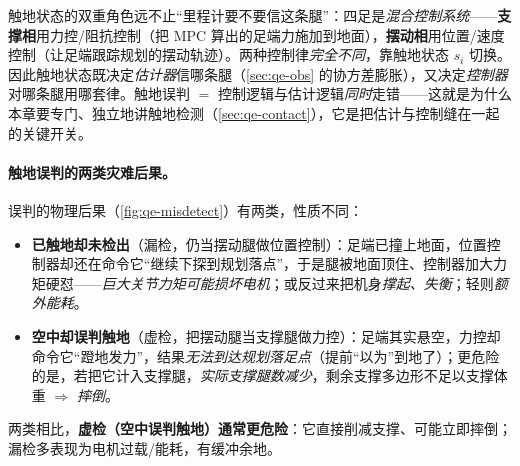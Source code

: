 \begin{insight}[触地检测是混合控制的开关]\label{ins:qe-contact-switch}
触地状态的双重角色远不止“里程计要不要信这条腿”：四足是\emph{混合控制系统}——\textbf{支撑相}用力控/阻抗控制（把 MPC 算出的足端力施加到地面），\textbf{摆动相}用位置/速度控制（让足端跟踪规划的摆动轨迹）。两种控制律\emph{完全不同}，靠触地状态 $s_i$ 切换。因此触地状态既决定\emph{估计器}信哪条腿（\cref{sec:qe-obs} 的协方差膨胀），又决定\emph{控制器}对哪条腿用哪套律。触地误判 $=$ 控制逻辑与估计逻辑\emph{同时}走错——这就是为什么本章要专门、独立地讲触地检测（\cref{sec:qe-contact}），它是把估计与控制缝在一起的关键开关。
\end{insight}

\paragraph{触地误判的两类灾难后果。}
误判的物理后果（\cref{fig:qe-misdetect}）有两类，性质不同：
\begin{itemize}
  \item \textbf{已触地却未检出}（漏检，仍当摆动腿做位置控制）：足端已撞上地面，位置控制器却还在命令它“继续下探到规划落点”，于是腿被地面顶住、控制器加大力矩硬怼——\emph{巨大关节力矩可能损坏电机}；或反过来把机身\emph{撑起、失衡}；轻则\emph{额外能耗}。
  \item \textbf{空中却误判触地}（虚检，把摆动腿当支撑腿做力控）：足端其实悬空，力控却命令它“蹬地发力”，结果\emph{无法到达规划落足点}（提前“以为”到地了）；更危险的是，若把它计入支撑腿，\emph{实际支撑腿数减少}，剩余支撑多边形不足以支撑体重 $\Rightarrow$ \emph{摔倒}。
\end{itemize}
两类相比，\textbf{虚检（空中误判触地）通常更危险}：它直接削减支撑、可能立即摔倒；漏检多表现为电机过载/能耗，有缓冲余地。

